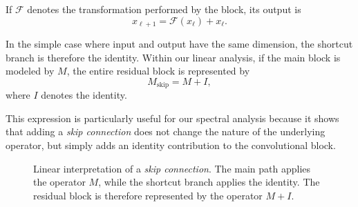 If $\mathcal{F}$ denotes the transformation performed by the block, its output is
\begin{equation}
    x_{\ell+1} = \mathcal{F}(x_\ell) + x_\ell.
\end{equation}

In the simple case where input and output have the same dimension, the shortcut branch is therefore the identity.
Within our linear analysis, if the main block is modeled by $M$,
the entire residual block is represented by
\begin{equation}
    M_{\mathrm{skip}} = M + I,
    \label{eq:skip_connection_matricielle}
\end{equation}
where $I$ denotes the identity.

This expression is particularly useful for our spectral analysis because it shows that adding a
\textit{skip connection} does not change the nature of the underlying operator, but simply adds an
identity contribution to the convolutional block.

\begin{figure}[H]
\centering
{}
\caption{Linear interpretation of a \textit{skip connection}. The main path applies the operator $M$, while the shortcut branch applies the identity. The residual block is therefore represented by the operator $M+I$.}
\end{figure}


